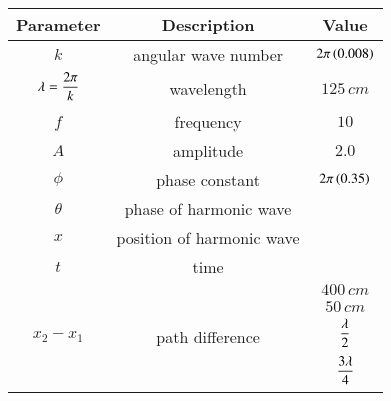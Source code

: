 \begin{tabular}{|c|c|c|}
\hline
\textbf{Parameter}&\textbf{Description} &\textbf{Value}\\
   \hline
   $k$ & angular wave number & $2\pi\left(0.008\right)$ \\
   \hline
   $\lambda=\dfrac{2\pi}{k\vphantom{\brak{0.1}}}$ & wavelength & $125\,cm$ \\
   \hline
   $f$ & frequency & $10$\\
   \hline
   $A$ & amplitude & $2.0$\\
   \hline
   $\phi$ & phase constant &  $2\pi\left(0.35\right)$ \\
   \hline
   $\theta$ & phase of harmonic wave & \\
   \hline
   $x$ & position of harmonic wave & \\
   \hline
   $t$ & time & \\
   \hline
   \multirow{4}{*}{$x_2 - x_1$} & \multirow{4}{*}{path difference} & $400\, cm$\\
   \cline{3-3}
   & & $50\, cm$ \\
   \cline{3-3}
   & & $\dfrac{\lambda}{2\vphantom{\brak{0.1}}}$ \\
   \cline{3-3}
   & & $\dfrac{3\lambda}{4\vphantom{\brak{0.1}}}$ \\
   \hline
\end{tabular}
